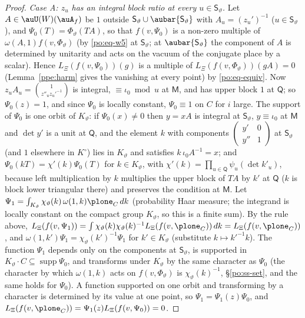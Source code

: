\documentclass[10pt]{amsart}
\theoremstyle{definition}
\theoremstyle{remark}
\begin{document}
\begin{proof}
\emph{Case A: $z_u$ has an integral block ratio at every $u\in\mathsf S_\vartheta$.} Let $A\in
\auU(W)(\auA_f)$ be $1$ outside $\mathsf S_\vartheta\cup\aubar{\mathsf S_\vartheta}$ with
$A_u=(z_u')^{-1}$ ($u\in\mathsf S_\vartheta$), and $\Psi_0(T)=\Phi_\vartheta(TA)$, so that
$f(v,\Psi_0)$ is a non-zero multiple of $\omega(A,1)f(v,\Phi_\vartheta)$ (by \eqref{po:eq-w5}
at $\mathsf S_\vartheta$; at $\aubar{\mathsf S_\vartheta}$ the component of $A$ is determined by
unitarity and acts on the vacuum of the conjugate place by a scalar). Hence $L_\Xi(f(v,\Psi_0))(g)$
is a multiple of $L_\Xi(f(v,\Phi_\vartheta))(gA)=0$ (Lemma~\ref{ppe:harm} gives the vanishing at every point) by
\eqref{po:eq-equiv}. Now $z_uA_u=\binom{1}{z''_u z_u'^{-1}}$ is integral, $\equiv\iota_0\bmod u$ at
$\mathsf M$, and has upper block $1$ at $\mathsf Q$; so $\Psi_0(z)=1$, and since $\Psi_0$ is
locally constant, $\Psi_0\equiv1$ on $C$ for $i$ large. The support of $\Psi_0$ is one orbit of
$K_\vartheta$: if $\Psi_0(x)\ne0$ then $y=xA$ is integral at $\mathsf S_\vartheta$, $y\equiv\iota_0$
at $\mathsf M$ and $\det y'$ is a unit at $\mathsf Q$, and the element $k$ with components
$\begin{pmatrix}y'&0\\y''&1\end{pmatrix}$ at $\mathsf S_\vartheta$ (and $1$ elsewhere in
$K^\circ$) lies in $K_\vartheta$ and satisfies $k\,\iota_0A^{-1}=x$; and
$\Psi_0(kT)=\chi'(k)\Psi_0(T)$ for $k\in K_\vartheta$, with $\chi'(k)=\prod_{u\in\mathsf Q}
\psi_u(\det k'_u)$, because left multiplication by $k$ multiplies the upper block of $TA$ by
$k'$ at $\mathsf Q$ ($k$ is block lower triangular there) and preserves the condition at
$\mathsf M$. Let $\Psi_1=\int_{K_\vartheta}\chi_\vartheta(k)\,\omega(1,k)\plone_C\,dk$ (probability Haar
measure; the integrand is locally constant on the compact group $K_\vartheta$, so this is a finite
sum). By the rule above, $L_\Xi(f(v,\Psi_1))=\int\chi_\vartheta(k)\chi_\vartheta(k)^{-1}
L_\Xi(f(v,\plone_C))\,dk=L_\Xi(f(v,\plone_C))$, and $\omega(1,k')\Psi_1=\chi_\vartheta(k')^{-1}
\Psi_1$ for $k'\in K_\vartheta$ (substitute $k\mapsto k'^{-1}k$). The function $\Psi_1$ depends only on the components
at $\mathsf S_\vartheta$, is supported in $K_\vartheta\cdot C\subseteq\operatorname{supp}\Psi_0$, and
transforms under $K_\vartheta$ by the same character as $\Psi_0$ (the character by which
$\omega(1,k)$ acts on $f(v,\Phi_\vartheta)$ is $\chi_\vartheta(k)^{-1}$, \S\ref{po:ss-set}, and the
same holds for $\Psi_0$). A function supported on one orbit and transforming by a character is
determined by its value at one point, so $\Psi_1=\Psi_1(z)\Psi_0$, and
$L_\Xi(f(v,\plone_C))=\Psi_1(z)L_\Xi(f(v,\Psi_0))=0$.


\end{proof}
\end{document}
